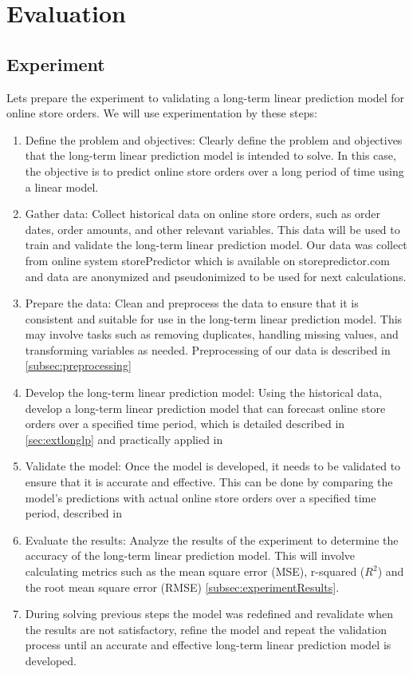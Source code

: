 
\chapter{Evaluation} \label{evaluation}
\section{Experiment} \label{sec:experiment}
Lets prepare the experiment to validating a long-term linear prediction model for online store orders.
We will use experimentation by these steps:\\
\begin{enumerate}
    \item Define the problem and objectives: Clearly define the problem and objectives that the long-term linear
    prediction model is intended to solve. In this case, the objective is to predict online store orders over a long
    period of time using a linear model.
    \item Gather data: Collect historical data on online store orders, such as order dates, order amounts, and other
    relevant variables. This data will be used to train and validate the long-term linear prediction model.
    Our data was collect from online system storePredictor which is available on storepredictor.com and data are
    anonymized and pseudonimized to be used for next calculations.
    \item Prepare the data: Clean and preprocess the data to ensure that it is consistent and suitable for
    use in the long-term linear prediction model. This may involve tasks such as removing duplicates, handling missing
    values, and transforming variables as needed. Preprocessing of our data is described in \ref{subsec:preprocessing}
    \item Develop the long-term linear prediction model: Using the historical data, develop a long-term linear
    prediction model that can forecast online store orders over a specified time period, which is detailed
    described in \ref{sec:extlonglp} and practically applied in \label{subsec:calculate_models}
    \item Validate the model: Once the model is developed, it needs to be validated to ensure that it is
    accurate and effective. This can be done by comparing the model's predictions with actual online store orders
    over a specified time period, described in \label{subsec:validatibg_models}
    \item Evaluate the results: Analyze the results of the experiment to determine the accuracy of the long-term
    linear prediction model. This will involve calculating metrics such as the mean square error (MSE),
    r-squared ($R^2$) and the root mean square error (RMSE) \ref{subsec:experimentResults}.
    \item During solving previous steps the model was redefined and revalidate when the results are not satisfactory,
    refine the model and repeat the validation process until an accurate and effective long-term linear prediction
    model is developed.
\end{enumerate}
